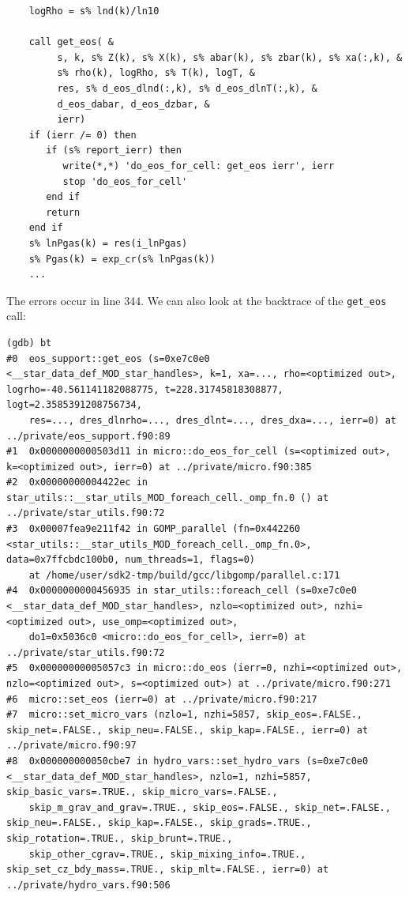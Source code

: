 \documentclass[a4paper,10pt]{article}
\begin{document}
\begin{verbatim}
    logRho = s% lnd(k)/ln10

    call get_eos( &
         s, k, s% Z(k), s% X(k), s% abar(k), s% zbar(k), s% xa(:,k), &
         s% rho(k), logRho, s% T(k), logT, &
         res, s% d_eos_dlnd(:,k), s% d_eos_dlnT(:,k), &
         d_eos_dabar, d_eos_dzbar, &
         ierr)
    if (ierr /= 0) then
       if (s% report_ierr) then
          write(*,*) 'do_eos_for_cell: get_eos ierr', ierr
          stop 'do_eos_for_cell'
       end if
       return
    end if
    s% lnPgas(k) = res(i_lnPgas)
    s% Pgas(k) = exp_cr(s% lnPgas(k))
    ...
\end{verbatim}

The errors occur in line 344.
We can also look at the backtrace of the \lstinline[style=output, breaklines=true]|get_eos| call:
\begin{verbatim}
(gdb) bt
#0  eos_support::get_eos (s=0xe7c0e0 <__star_data_def_MOD_star_handles>, k=1, xa=..., rho=<optimized out>, logrho=-40.561141182088775, t=228.31745818308877, logt=2.3585391208756734, 
    res=..., dres_dlnrho=..., dres_dlnt=..., dres_dxa=..., ierr=0) at ../private/eos_support.f90:89
#1  0x0000000000503d11 in micro::do_eos_for_cell (s=<optimized out>, k=<optimized out>, ierr=0) at ../private/micro.f90:385
#2  0x00000000004422ec in star_utils::__star_utils_MOD_foreach_cell._omp_fn.0 () at ../private/star_utils.f90:72
#3  0x00007fea9e211f42 in GOMP_parallel (fn=0x442260 <star_utils::__star_utils_MOD_foreach_cell._omp_fn.0>, data=0x7ffcbdc100b0, num_threads=1, flags=0)
    at /home/user/sdk2-tmp/build/gcc/libgomp/parallel.c:171
#4  0x0000000000456935 in star_utils::foreach_cell (s=0xe7c0e0 <__star_data_def_MOD_star_handles>, nzlo=<optimized out>, nzhi=<optimized out>, use_omp=<optimized out>, 
    do1=0x5036c0 <micro::do_eos_for_cell>, ierr=0) at ../private/star_utils.f90:72
#5  0x00000000005057c3 in micro::do_eos (ierr=0, nzhi=<optimized out>, nzlo=<optimized out>, s=<optimized out>) at ../private/micro.f90:271
#6  micro::set_eos (ierr=0) at ../private/micro.f90:217
#7  micro::set_micro_vars (nzlo=1, nzhi=5857, skip_eos=.FALSE., skip_net=.FALSE., skip_neu=.FALSE., skip_kap=.FALSE., ierr=0) at ../private/micro.f90:97
#8  0x000000000050cbe7 in hydro_vars::set_hydro_vars (s=0xe7c0e0 <__star_data_def_MOD_star_handles>, nzlo=1, nzhi=5857, skip_basic_vars=.TRUE., skip_micro_vars=.FALSE., 
    skip_m_grav_and_grav=.TRUE., skip_eos=.FALSE., skip_net=.FALSE., skip_neu=.FALSE., skip_kap=.FALSE., skip_grads=.TRUE., skip_rotation=.TRUE., skip_brunt=.TRUE., 
    skip_other_cgrav=.TRUE., skip_mixing_info=.TRUE., skip_set_cz_bdy_mass=.TRUE., skip_mlt=.FALSE., ierr=0) at ../private/hydro_vars.f90:506

\end{verbatim}
\end{document}

